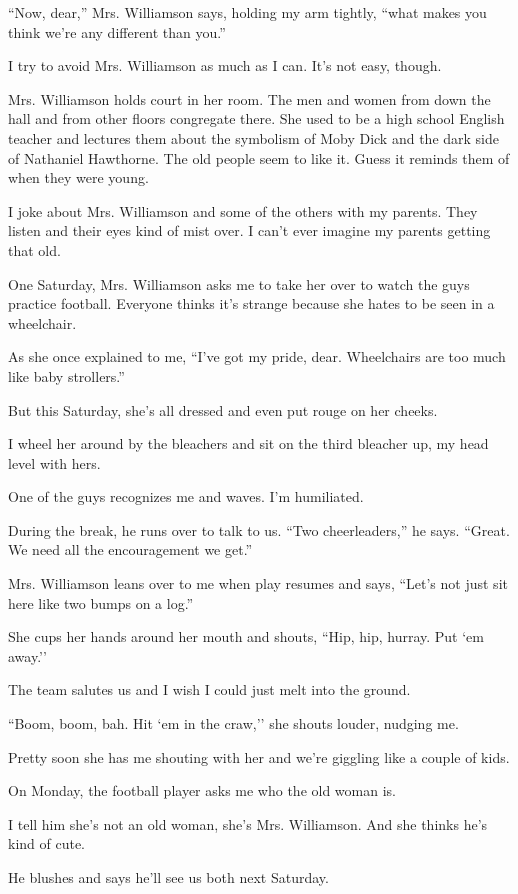 \documentclass[twoside,10pt]{book}
\begin{document}
``Now, dear,'' Mrs. Williamson says, holding my arm tightly, ``what
makes you think we're any different than you.''

I try to avoid Mrs. Williamson as much as I can. It's not easy, though.

Mrs. Williamson holds court in her room. The men and women from down the
hall and from other floors congregate there. She used to be a high
school English teacher and lectures them about the symbolism of {Moby
Dick} and the dark side of Nathaniel Hawthorne. The old people seem to
like it. Guess it reminds them of when they were young.

I joke about Mrs. Williamson and some of the others with my parents.
They listen and their eyes kind of mist over. I can't ever imagine my
parents getting that old.

One Saturday, Mrs. Williamson asks me to take her over to watch the guys
practice football. Everyone thinks it's strange because she hates to be
seen in a wheelchair.

As she once explained to me, ``I've got my pride, dear. Wheelchairs are
too much like baby strollers.''

But this Saturday, she's all dressed and even put rouge on her cheeks.

I wheel her around by the bleachers and sit on the third bleacher up, my
head level with hers.

One of the guys recognizes me and waves. I'm humiliated.

During the break, he runs over to talk to us. ``Two cheerleaders,'' he
says. ``Great. We need all the encouragement we get.''

Mrs. Williamson leans over to me when play resumes and says, ``Let's not
just sit here like two bumps on a log.''

She cups her hands around her mouth and shouts, ``Hip, hip, hurray. Put
`em away.''

The team salutes us and I wish I could just melt into the ground.

``Boom, boom, bah. Hit `em in the craw,'' she shouts louder, nudging me.

Pretty soon she has me shouting with her and we're giggling like a
couple of kids.

On Monday, the football player asks me who the old woman is.

I tell him she's not an old woman, she's Mrs. Williamson. And she thinks
he's kind of cute.

He blushes and says he'll see us both next Saturday.
\end{document}
